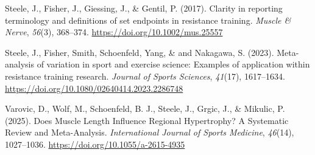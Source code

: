 \documentclass[
]{article}
\newlength{\cslhangindent}
\newenvironment{CSLReferences}[2] %
 {\begin{list}{}{%
  \setlength{\itemindent}{0pt}
  \setlength{\leftmargin}{0pt}
  \setlength{\parsep}{0pt}
  \ifodd #1
   \setlength{\leftmargin}{\cslhangindent}
   \setlength{\itemindent}{-1\cslhangindent}
  \fi
  \setlength{\itemsep}{#2\baselineskip}}}
 {\end{list}}
\begin{document}
\begin{CSLReferences}{1}{0}
Steele, J., Fisher, J., Giessing, J., \& Gentil, P. (2017). Clarity in
reporting terminology and definitions of set endpoints in resistance
training. \emph{Muscle \& Nerve}, \emph{56}(3), 368--374.
\url{https://doi.org/10.1002/mus.25557}

Steele, J., Fisher, Smith, Schoenfeld, Yang, \& and Nakagawa, S. (2023).
Meta-analysis of variation in sport and exercise science: {Examples} of
application within resistance training research. \emph{Journal of Sports
Sciences}, \emph{41}(17), 1617--1634.
\url{https://doi.org/10.1080/02640414.2023.2286748}

Varovic, D., Wolf, M., Schoenfeld, B. J., Steele, J., Grgic, J., \&
Mikulic, P. (2025). Does {Muscle Length Influence Regional Hypertrophy}?
{A Systematic Review} and {Meta-Analysis}. \emph{International Journal
of Sports Medicine}, \emph{46}(14), 1027--1036.
\url{https://doi.org/10.1055/a-2615-4935}

\end{CSLReferences}
\end{document}

